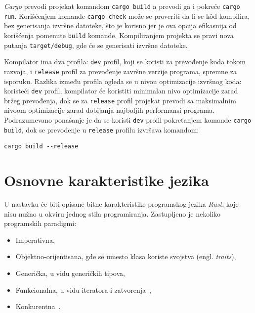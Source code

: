 \documentclass[12pt,oneside]{memoir}
\begin{document}


\emph{Cargo} prevodi projekat komandom
\texttt{cargo build} a prevodi ga i pokreće
\texttt{cargo run}. Korišćenjem komande \texttt{cargo check}
može se proveriti da li se kôd kompilira, bez generisanja
izvršne datoteke, što je korisno jer je ova opcija efikasnija
od korišćenja pomenute \texttt{build} komande. Kompiliranjem
projekta se pravi nova putanja \texttt{target/debug}, gde će se
generisati izvršne datoteke.

Kompilator ima dva profila: \texttt{dev} profil, koji se koristi za prevođenje koda tokom razvoja, i
\texttt{release} profil za prevođenje završne verzije programa, spremne za isporuku. Razlika između
profila ogleda se u nivou optimizacije izvršnog koda: koristeći \texttt{dev} profil, kompilator
će koristiti minimalan nivo optimizacije zarad bržeg prevođenja, dok se za \texttt{release} profil
projekat prevodi sa maksimalnim nivoom optimizacije zarad dobijanja najboljih performansi
programa. Podrazumevano ponašanje je da se koristi \texttt{dev} profil pokretanjem
komande \texttt{cargo build}, dok se prevođenje u \texttt{release} profilu izvršava komandom:

\begin{lstlisting}[language={}, style=text]
cargo build --release
\end{lstlisting}

\section{Osnovne karakteristike jezika}
U nastavku će biti opisane bitne karakteristike programskog jezika \emph{Rust}, koje nisu nužno
u okviru jednog stila programiranja. Zastupljeno je nekoliko programskih paradigmi:

\begin{itemize}
    \item Imperativna,
    \item Objektno-orijentisana, gde se umesto klasa koriste svojstva (engl. \emph{traits}),
    \item Generička, u vidu generičkih tipova,
    \item Funkcionalna, u vidu iteratora i zatvorenja~\cite{functional_rust},
    \item Konkurentna~\cite{concurrent_rust}.
\end{itemize}
\end{document}
